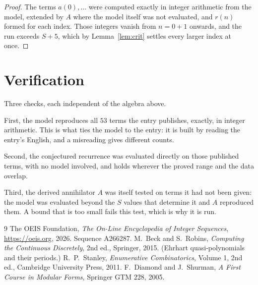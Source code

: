 \documentclass[11pt,a4paper]{article}
\theoremstyle{plain}
\theoremstyle{definition}
\begin{document}
\begin{proof}
The terms $a(0),\dots$ were computed exactly in integer arithmetic from the model, extended by
$A$ where the model itself was not evaluated, and $r(n)$ formed for each index. Those integers
vanish from $n=0+1$ onwards, and the run exceeds $S+5$, which by
Lemma~\ref{lem:crit} settles every larger index at once.
\end{proof}

\section{Verification}

Three checks, each independent of the algebra above.

First, the model reproduces all $53$ terms the entry publishes, exactly, in integer
arithmetic. This is what ties the model to the entry: it is built by reading the entry's
English, and a misreading gives different counts.

Second, the conjectured recurrence was evaluated directly on those published terms, with no
model involved, and holds wherever the proved range and the data overlap.

Third, the derived annihilator $A$ was itself tested on terms it had not been given: the model
was evaluated beyond the $S$ values that determine it and $A$ reproduced them. A bound that is
too small fails this test, which is why it is run.

\begin{thebibliography}{9}
 The OEIS Foundation, \emph{The On-Line Encyclopedia of Integer
Sequences}, \url{https://oeis.org}, 2026. Sequence A266287.
 M.~Beck and S.~Robins, \emph{Computing the Continuous Discretely},
2nd ed., Springer, 2015. (Ehrhart quasi-polynomials and their periods.)
 R.~P.~Stanley, \emph{Enumerative Combinatorics}, Volume 1, 2nd ed.,
Cambridge University Press, 2011.
 F.~Diamond and J.~Shurman, \emph{A First Course in Modular Forms},
Springer GTM 228, 2005.
\end{thebibliography}
\end{document}
